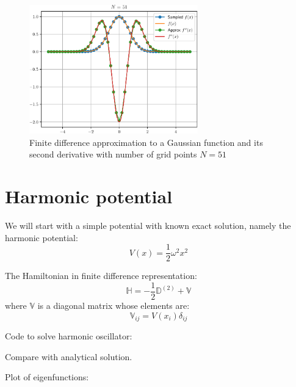 \begin{figure}[H]
{\center
\includegraphics[width=0.65\textwidth]{../codes/FD1d/IMG_gaussian_51.pdf}
\par}
\caption{Finite difference approximation to a Gaussian function and its second derivative with
number of grid points $N=51$}
\end{figure}


\section{Harmonic potential}

We will start with a simple potential with known exact solution, namely the harmonic potential:
\begin{equation}
V(x) = \frac{1}{2}\omega^2 x^2
\end{equation}

The Hamiltonian in finite difference representation:
\begin{equation}
\mathbb{H} = -\frac{1}{2}\mathbb{D}^{(2)} + \mathbb{V}
\end{equation}
where $\mathbb{V}$ is a diagonal matrix whose elements are:
\begin{equation}
\mathbb{V}_{ij} = V(x_{i})\delta_{ij}
\end{equation}


Code to solve harmonic oscillator:


Compare with analytical solution.

Plot of eigenfunctions:

